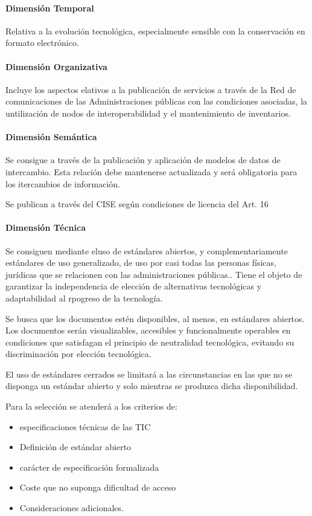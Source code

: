         \paragraph{Dimensión Temporal} %
            Relativa a la evolución tecnológica, especialmente sensible con la conservación en formato electrónico. 

        \paragraph{Dimensión Organizativa} %
            Incluye los aspectos elativos a la publicación de servicios a través de la Red de comunicaciones de las Administraciones públicas con las condiciones asociadas, la untilización de nodos de interoperabilidad y el mantenimiento de inventarios.

        \paragraph{Dimensión Semántica} %
            Se consigue a través de la publicación y aplicación de modelos de datos de intercambio. Esta relación debe mantenerse actualizada y será obligatoria para los itercambios de información. 

            Se publican a través del CISE según condiciones de licencia del Art. 16

        \paragraph{Dimensión Técnica} %
            Se consiguen mediante eluso de estándares abiertos, y complementariamente estándares de uso generalizado, de uso por casi todas las personas físicas, jurídicas que se relacionen con las administraciones públicas.. Tiene el objeto de garantizar la independencia de elección de alternativas tecnológicas y adaptabilidad al rpogreso de la tecnología.

            Se busca que los documentos estén disponibles, al menos, en estándares abiertos. Los documentos serán visualizables, accesibles y funcionalmente operables en condiciones que satisfagan el principio de neutralidad tecnológica, evitando su discriminación por elección tecnológica.

            El uso de estándares cerrados se limitará a las circunstancias en las que no se disponga un estándar abierto y solo mientras se produzca dicha disponibilidad.

            Para la selección se atenderá a los criterios de:
            \begin{itemize}
                \item especificaciones técnicas de las TIC
                \item Definición de estándar abierto
                \item carácter de especificación formalizada
                \item Coste que no suponga dificultad de acceso
                \item Consideraciones adicionales.
            \end{itemize}

